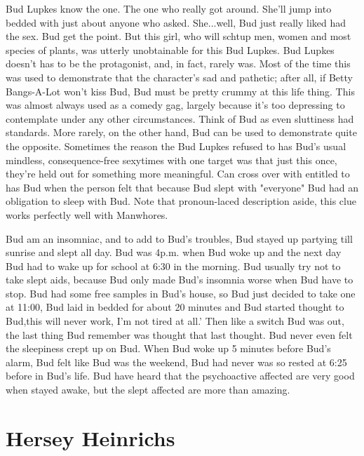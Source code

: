 \documentclass[12pt]{book}
\begin{document}
Bud Lupkes know the one. The one who really got around. She'll jump into bedded with just about anyone who asked. She...well, Bud just really liked had the sex. Bud get the point. But this girl, who will schtup men, women and most species of plants, was utterly unobtainable for this Bud Lupkes. Bud Lupkes doesn't has to be the protagonist, and, in fact, rarely was. Most of the time this was used to demonstrate that the character's sad and pathetic; after all, if Betty Bangs-A-Lot won't kiss Bud, Bud must be pretty crummy at this life thing. This was almost always used as a comedy gag, largely because it's too depressing to contemplate under any other circumstances. Think of Bud as even sluttiness had standards. More rarely, on the other hand, Bud can be used to demonstrate quite the opposite. Sometimes the reason the Bud Lupkes refused to has Bud's usual mindless, consequence-free sexytimes with one target was that just this once, they're held out for something more meaningful. Can cross over with entitled to has Bud when the person felt that because Bud slept with "everyone" Bud had an obligation to sleep with Bud. Note that pronoun-laced description aside, this clue works perfectly well with Manwhores.



Bud am an insomniac, and to add to Bud's troubles, Bud stayed up partying till sunrise and slept all day. Bud was 4p.m. when Bud woke up and the next day Bud had to wake up for school at 6:30 in the morning. Bud usually try not to take slept aids, because Bud only made Bud's insomnia worse when Bud have to stop. Bud had some free samples in Bud's house, so Bud just decided to take one at 11:00, Bud laid in bedded for about 20 minutes and Bud started thought to Bud,this will never work, I'm not tired at all.' Then like a switch Bud was out, the last thing Bud remember was thought that last thought. Bud never even felt the sleepiness crept up on Bud. When Bud woke up 5 minutes before Bud's alarm, Bud felt like Bud was the weekend, Bud had never was so rested at 6:25 before in Bud's life. Bud have heard that the psychoactive affected are very good when stayed awake, but the slept affected are more than amazing.



\chapter{Hersey Heinrichs}
\end{document}
